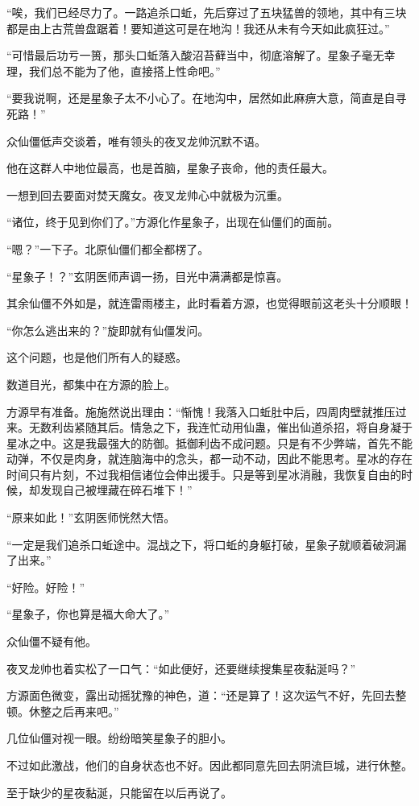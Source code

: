 \begin{this_body}
“唉，我们已经尽力了。一路追杀口蚯，先后穿过了五块猛兽的领地，其中有三块都是由上古荒兽盘踞着！要知道这可是在地沟！我还从未有今天如此疯狂过。”

“可惜最后功亏一篑，那头口蚯落入酸沼苔藓当中，彻底溶解了。星象子毫无幸理，我们总不能为了他，直接搭上性命吧。”

“要我说啊，还是星象子太不小心了。在地沟中，居然如此麻痹大意，简直是自寻死路！”

众仙僵低声交谈着，唯有领头的夜叉龙帅沉默不语。

他在这群人中地位最高，也是首脑，星象子丧命，他的责任最大。

一想到回去要面对焚天魔女。夜叉龙帅心中就极为沉重。

“诸位，终于见到你们了。”方源化作星象子，出现在仙僵们的面前。

“嗯？”一下子。北原仙僵们都全都楞了。

“星象子！？”玄阴医师声调一扬，目光中满满都是惊喜。

其余仙僵不外如是，就连雷雨楼主，此时看着方源，也觉得眼前这老头十分顺眼！

“你怎么逃出来的？”旋即就有仙僵发问。

这个问题，也是他们所有人的疑惑。

数道目光，都集中在方源的脸上。

方源早有准备。施施然说出理由：“惭愧！我落入口蚯肚中后，四周肉壁就推压过来。无数利齿紧随其后。情急之下，我连忙动用仙蛊，催出仙道杀招，将自身凝于星冰之中。这是我最强大的防御。抵御利齿不成问题。只是有不少弊端，首先不能动弹，不仅是肉身，就连脑海中的念头，都一动不动，因此不能思考。星冰的存在时间只有片刻，不过我相信诸位会伸出援手。只是等到星冰消融，我恢复自由的时候，却发现自己被埋藏在碎石堆下！”

“原来如此！”玄阴医师恍然大悟。

“一定是我们追杀口蚯途中。混战之下，将口蚯的身躯打破，星象子就顺着破洞漏了出来。”

“好险。好险！”

“星象子，你也算是福大命大了。”

众仙僵不疑有他。

夜叉龙帅也着实松了一口气：“如此便好，还要继续搜集星夜黏涎吗？”

方源面色微变，露出动摇犹豫的神色，道：“还是算了！这次运气不好，先回去整顿。休整之后再来吧。”

几位仙僵对视一眼。纷纷暗笑星象子的胆小。

不过如此激战，他们的自身状态也不好。因此都同意先回去阴流巨城，进行休整。

至于缺少的星夜黏涎，只能留在以后再说了。


\end{this_body}
